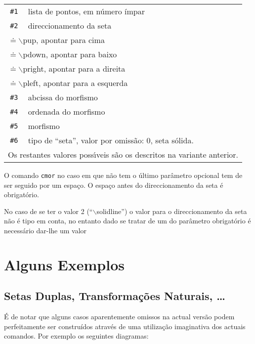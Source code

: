 \documentclass[a4paper,11pt]{article}
\begin{document}
\begin{description}
  \begin{tabular}{c@{---}l}
    {\tt \#1} & lista de pontos, em número ímpar \\
    {\tt \#2} & direccionamento da seta \\
    \multicolumn{2}{l}{\qquad 0 $\doteq\backslash$pup, apontar para cima}\\ 
    \multicolumn{2}{l}{\qquad 1 $\doteq \backslash$pdown, apontar para
      baixo}\\
    \multicolumn{2}{l}{\qquad 2 $\doteq \backslash$pright, apontar para a
      direita}\\
    \multicolumn{2}{l}{\qquad 3 $\doteq \backslash$pleft, apontar para a
      esquerda}\\ 
    {\tt \#3} & abcissa do morfismo\\
    {\tt \#4} & ordenada do morfismo\\
    {\tt \#5} & morfismo\\
    {\tt \#6} & tipo de ``seta'', valor por omissão: 0, seta
    sólida.\\
    \multicolumn{2}{l}{\hspace*{4.5em} Os restantes valores poss\'\i veis
      s\~ao os descritos na variante anterior.}\\  

 \end{tabular}

  O comando {\tt cmor} no caso em que não tem o último parâmetro opcional
  tem de ser seguido por um espaço. O espaço antes do direccionamento
  da seta é obrigatório.

  No caso de se ter o valor 2 (``$\backslash$solidline'') o valor para o
  direccionamento da seta não é tipo em conta, no entanto dado se
  tratar de um do parâmetro obrigatório é necessário dar-lhe um valor
\end{description}


\section{Alguns Exemplos}


\subsection{Setas Duplas, Transformações Naturais, \ldots}

É de notar que alguns casos aparentemente omissos na actual versão
podem perfeitamente ser construídos através de uma utilização
imaginativa dos actuais comandos. Por exemplo os seguintes diagramas: 
\end{document}

